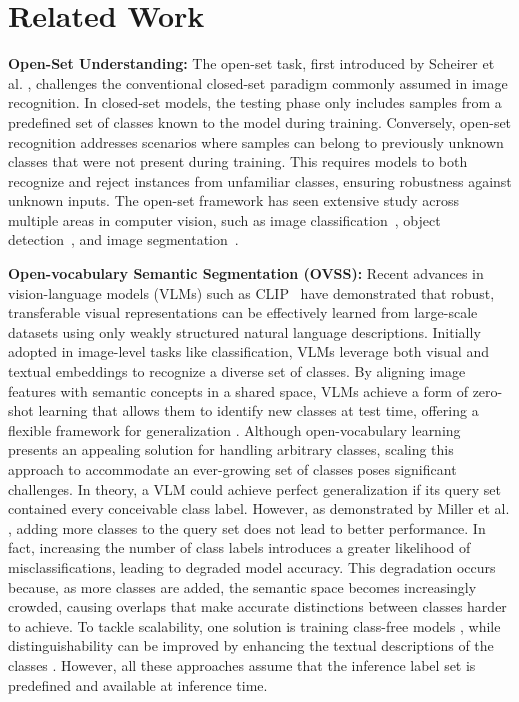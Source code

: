 \section{Related Work}
\label{sec:related}
\textbf{Open-Set Understanding:}
The open-set task, first introduced by Scheirer et al. \cite{scheirer2012toward}, challenges the conventional closed-set paradigm commonly assumed in image recognition. In closed-set models, the testing phase only includes samples from a predefined set of classes known to the model during training. Conversely, open-set recognition addresses scenarios where samples can belong to previously unknown classes that were not present during training. This requires models to both recognize and reject instances from unfamiliar classes, ensuring robustness against unknown inputs. The open-set framework has seen extensive study across multiple areas in computer vision, such as image classification~\cite{bendale2016towards, vaze2022open, yoshihashi2019classification, oza2019c2ae, perera2020generative, chen2021adversarial,zhang2020hybrid}, %
object detection~\cite{han2022expanding, miller2020uncertainty, zhou2023open}, %
and image segmentation~\cite{hwang2021exemplar, pham2018bayesian, cen2021deep}.%


\textbf{Open-vocabulary Semantic Segmentation (OVSS):}
Recent advances in vision-language models (VLMs) such as CLIP~\cite{radford2021learning} have demonstrated that robust, transferable visual representations can be effectively learned from large-scale datasets using only weakly structured natural language descriptions.
Initially adopted in image-level tasks like classification, VLMs leverage both visual and textual embeddings to recognize a diverse set of classes. %
By aligning image features with semantic concepts in a shared space, VLMs achieve a form of zero-shot learning that allows them to identify new classes at test time, offering a flexible framework for generalization \cite{liu2024open,xie2024sed,cho2024cat}. 
Although open-vocabulary learning presents an appealing solution for handling arbitrary classes, scaling this approach to accommodate an ever-growing set of classes poses significant challenges. In theory, a VLM could achieve perfect generalization if its query set contained every conceivable class label. However, as demonstrated by Miller et al. \cite{miller2025open}, adding more classes to the query set does not lead to better performance. In fact, increasing the number of class labels introduces a greater likelihood of misclassifications, leading to degraded model accuracy. This degradation occurs because, as more classes are added, the semantic space becomes increasingly crowded, causing overlaps that make accurate distinctions between classes harder to achieve. 
To tackle scalability, one solution is training class-free models \cite{shin2024towards}, while distinguishability can be improved by enhancing the textual descriptions of the classes \cite{ma2024open,jiao2024collaborative}. However, all these approaches assume that the inference label set is predefined and available at inference time.%




